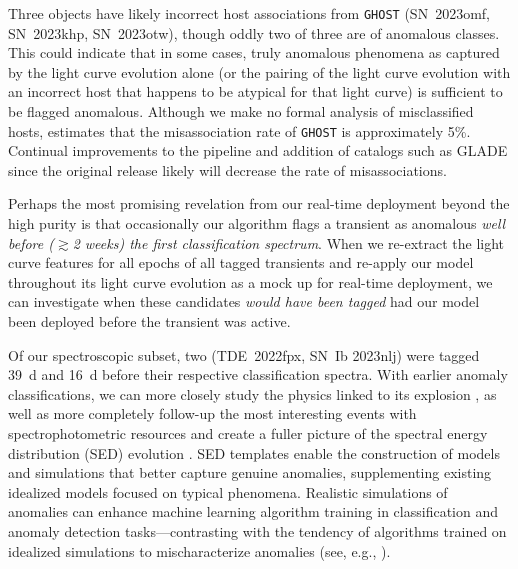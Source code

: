 \documentclass[twocolumn]{aastex63}
\begin{document}
Three objects have likely incorrect host associations from \texttt{GHOST} (SN~2023omf, SN~2023khp, SN~2023otw), though oddly two of three are of anomalous classes. This could indicate that in some cases, truly anomalous phenomena as captured by the light curve evolution alone (or the pairing of the light curve evolution with an incorrect host that happens to be atypical for that light curve) is sufficient to be flagged anomalous. Although we make no formal analysis of misclassified hosts, \cite{Gagliano2021} estimates that the misassociation rate of \texttt{GHOST} is approximately 5\%. Continual improvements to the pipeline and addition of catalogs such as GLADE \citep{Dalya2018} since the original release likely will decrease the rate of misassociations. \par

Perhaps the most promising revelation from our real-time deployment beyond the high purity is that occasionally our algorithm flags a transient as anomalous \emph{well before ($\gtrsim$2 weeks) the first classification spectrum}. When we re-extract the light curve features for all epochs of all tagged transients and re-apply our model throughout its light curve evolution as a mock up for real-time deployment, we can investigate when these candidates \emph{would have been tagged} had our model been deployed before the transient was active. \par

Of our spectroscopic subset, two (TDE~2022fpx, SN~Ib 2023nlj) were tagged 39~d and 16~d before their respective classification spectra. With earlier anomaly classifications, we can more closely study the physics linked to its explosion \citep{2022Gagliano_CCA}, as well as more completely follow-up the most interesting events with spectrophotometric resources and create a fuller picture of the spectral energy distribution (SED) evolution \citep{Pierel2018, Vincenzi2019}. SED templates enable the construction of models and simulations that better capture genuine anomalies, supplementing existing idealized models focused on typical phenomena. Realistic simulations of anomalies can enhance machine learning algorithm training in classification and anomaly detection tasks---contrasting with the tendency of algorithms trained on idealized simulations to mischaracterize anomalies (see, e.g., \citealt{Muthukrishna2022, Aleo2023}). \par
\end{document}
